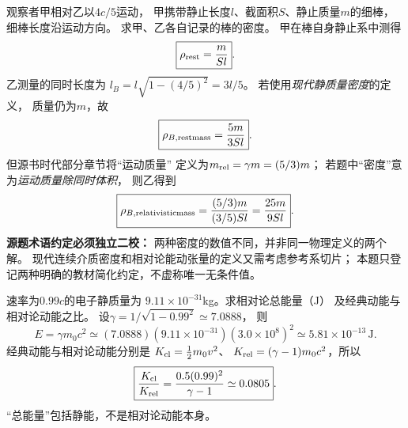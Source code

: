\problemtext 观察者甲相对乙以$4c/5$运动，
甲携带静止长度$l$、截面积$S$、静止质量$m$的细棒，
细棒长度沿运动方向。
求甲、乙各自记录的棒的密度。
\workings
甲在棒自身静止系中测得
\[
\boxed{\rho_{\rm rest}=\frac{m}{Sl}}.
\]
乙测量的同时长度为
$l_B=l\sqrt{1-(4/5)^2}=3l/5$。
若使用\emph{现代静质量密度}的定义，
质量仍为$m$，故
\[
\boxed{\rho_{B,\rm restmass}=\frac{5m}{3Sl}}.
\]
但源书时代部分章节将“运动质量”
定义为$m_{\rm rel}=\gamma m=(5/3)m$；
若题中“密度”意为\emph{运动质量除同时体积}，
则乙得到
\[
\boxed{\rho_{B,\rm relativisticmass}
=\frac{(5/3)m}{(3/5)Sl}=\frac{25m}{9Sl}}.
\]
\crosscheck \textbf{源题术语约定必须独立二校：}
两种密度的数值不同，并非同一物理定义的两个解。
现代连续介质密度和相对论能动张量的定义又需考虑参考系切片；
本题只登记两种明确的教材简化约定，不虚称唯一无条件值。

\problemtext 速率为$0.99c$的电子静质量为
$9.11\times10^{-31}$kg。求相对论总能量（J）
及经典动能与相对论动能之比。
\workings
设$\gamma=1/\sqrt{1-0.99^2}\simeq7.0888$，
则
\[
\boxed{E=\gamma m_0c^2
\simeq(7.0888)(9.11\times10^{-31})(3.0\times10^8)^2
\simeq5.81\times10^{-13}\,\mathrm J}.
\]
经典动能与相对论动能分别是
$K_{\rm cl}=\tfrac12m_0v^2$、
$K_{\rm rel}=(\gamma-1)m_0c^2$，所以
\[
\boxed{\frac{K_{\rm cl}}{K_{\rm rel}}
=\frac{0.5(0.99)^2}{\gamma-1}
\simeq0.0805}.
\]
\crosscheck “总能量”包括静能，不是相对论动能本身。
